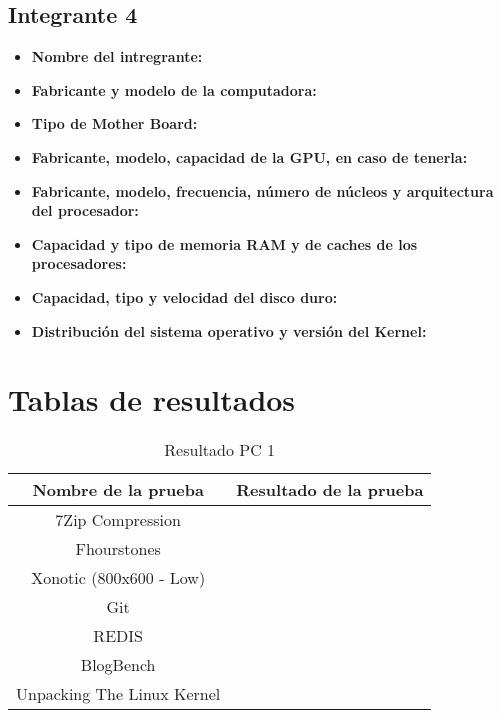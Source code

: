 \documentclass[12pt]{article}
\newcommand{\pl}[1]{\item \textbf{ #1 }}
\begin{document}
\subsection{Integrante 4}
\begin{itemize}
    \pl{Nombre del intregrante:}

    \pl{Fabricante y modelo de la computadora:}

    \pl{Tipo de Mother Board:}

    \pl{Fabricante, modelo, capacidad de la GPU, en caso de tenerla:}

    \pl{Fabricante, modelo, frecuencia, número de núcleos y arquitectura del procesador:}

    \pl{Capacidad y tipo de memoria RAM y de caches de los procesadores:}

    \pl{Capacidad, tipo y velocidad del disco duro:}

    \pl{Distribución del sistema operativo y versión del Kernel:}
\end{itemize}

\newpage
\section{Tablas de resultados}

\begin{table}[!htb]
    \centering
    \begin{tabular}{|c|c|}
        \hline
        \textbf{Nombre de la prueba} & \textbf{Resultado de la prueba}\\
        \hline
        7Zip Compression &  \\
        \hline
        Fhourstones &  \\
        \hline
        Xonotic (800x600 - Low) &  \\
        \hline
        Git &  \\
        \hline
        REDIS &  \\
        \hline
        BlogBench &  \\
        \hline
        Unpacking The Linux Kernel &  \\
        \hline
    \end{tabular}
    \caption{Resultado PC 1}
\end{table}
\end{document}
